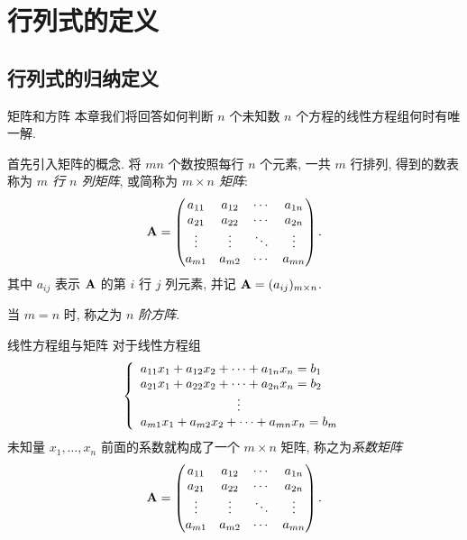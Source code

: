\section{行列式的定义}

\subsection{行列式的归纳定义}
\begin{frame}{矩阵和方阵}
	\onslide<+->
	本章我们将回答如何判断 $n$ 个未知数 $n$ 个方程的线性方程组何时有唯一解.

	\onslide<+->
	首先引入矩阵的概念.
	\onslide<+->
	将 $mn$ 个数按照每行 $n$ 个元素, 一共 $m$ 行排列, 得到的数表称为 \emph{$m$ 行 $n$ 列矩阵}, 或简称为 \emph{$m\times n$ 矩阵}:
	\[{\mathbf{A}}=\begin{pmatrix}
		a_{11}&a_{12}&\cdots &a_{1n}\\
		a_{21}&a_{22}&\cdots &a_{2n}\\
		\vdots&\vdots&\ddots&\vdots\\
		a_{m1}&a_{m2}&\cdots &a_{mn}
	\end{pmatrix}.\]
	\onslide<+->
	其中 $a_{ij}$ 表示 ${\mathbf{A}}$ 的第 $i$ 行 $j$ 列元素, 并记 ${\mathbf{A}}=(a_{ij})_{m\times n}$.

	\onslide<+->
	当 $m=n$ 时, 称之为 \emph{$n$ 阶方阵}.
\end{frame}


\begin{frame}{线性方程组与矩阵}
	\onslide<+->
	对于线性方程组
	\[\laeq{
		a_{11}x_1+a_{12}x_2+\cdots+a_{1n}x_n=b_1\\
		a_{21}x_1+a_{22}x_2+\cdots+a_{2n}x_n=b_2\\
		\vvdots\\
		a_{m1}x_1+a_{m2}x_2+\cdots+a_{mn}x_n=b_m
	}\]
	\onslide<+->
	未知量 $x_1,\dots,x_n$ 前面的系数就构成了一个 $m\times n$ 矩阵, 称之为\emph{系数矩阵}
	\[{\mathbf{A}}=\begin{pmatrix}
		a_{11}&a_{12}&\cdots &a_{1n}\\
		a_{21}&a_{22}&\cdots &a_{2n}\\
		\vdots&\vdots&\ddots&\vdots\\
		a_{m1}&a_{m2}&\cdots &a_{mn}
	\end{pmatrix}.\]
\end{frame}



